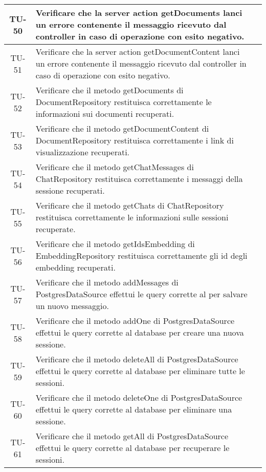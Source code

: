 \begin{xltabular}{\textwidth}{| c | X | c |}
    \hline
    TU-50 & Verificare che la server action getDocuments lanci un errore contenente il messaggio ricevuto dal controller in caso di operazione con esito negativo. & \textcolor{cmarkcolor}{} \\
    \hline
    TU-51 & Verificare che la server action getDocumentContent lanci un errore contenente il messaggio ricevuto dal controller in caso di operazione con esito negativo. & \textcolor{cmarkcolor}{} \\
    \hline
    TU-52 & Verificare che il metodo getDocuments di DocumentRepository restituisca correttamente le informazioni sui documenti recuperati. & \textcolor{cmarkcolor}{} \\ 
    \hline
    TU-53 & Verificare che il metodo getDocumentContent di DocumentRepository restituisca correttamente i link di visualizzazione recuperati. & \textcolor{cmarkcolor}{} \\
    \hline
    TU-54 & Verificare che il metodo getChatMessages di ChatRepository restituisca correttamente i messaggi della sessione recuperati. & \textcolor{cmarkcolor}{} \\
    \hline
    TU-55 & Verificare che il metodo getChats di ChatRepository restituisca correttamente le informazioni sulle sessioni recuperate. & \textcolor{cmarkcolor}{} \\
    \hline
    TU-56 & Verificare che il metodo getIdsEmbedding di EmbeddingRepository restituisca correttamente gli id degli embedding recuperati. & \textcolor{cmarkcolor}{} \\
    \hline
    TU-57 & Verificare che il metodo addMessages di PostgresDataSource effettui le query corrette al  per salvare un nuovo messaggio. & \textcolor{cmarkcolor}{} \\
    \hline
    TU-58 & Verificare che il metodo addOne di PostgresDataSource effettui le query corrette al database per creare una nuova sessione. & \textcolor{cmarkcolor}{} \\
    \hline
    TU-59 & Verificare che il metodo deleteAll di PostgresDataSource effettui le query corrette al database per eliminare tutte le sessioni. & \textcolor{cmarkcolor}{} \\
    \hline
    TU-60 & Verificare che il metodo deleteOne di PostgresDataSource effettui le query corrette al database per eliminare una sessione. & \textcolor{cmarkcolor}{} \\
    \hline
    TU-61 & Verificare che il metodo getAll di PostgresDataSource effettui le query corrette al database per recuperare le sessioni. & \textcolor{cmarkcolor}{} \\

\end{xltabular}
